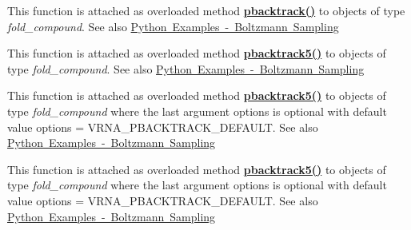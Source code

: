 \begin{DoxyRefList}
\item[Global \mbox{\hyperlink{group__subopt__stochbt_ga594844ac73c4e66e00d6791b31540634}{vrna\+\_\+pbacktrack}} (vrna\+\_\+fold\+\_\+compound\+\_\+t $\ast$fc)]\label{wrappers__wrappers000006}%
%
 This function is attached as overloaded method {\bfseries{\mbox{\hyperlink{group__subopt__stochbt__deprecated_gac03ca6db186bb3bf0a2a326d7fb3ba03}{pbacktrack()}}}} to objects of type {\itshape fold\+\_\+compound}. See also \mbox{\hyperlink{examples_python_examples_python_pbacktrack}{Python Examples -\/ Boltzmann Sampling}}  
\item[Global \mbox{\hyperlink{group__subopt__stochbt_ga72ebbe45bcbce147a12f27f62b38db78}{vrna\+\_\+pbacktrack5}} (vrna\+\_\+fold\+\_\+compound\+\_\+t $\ast$fc, unsigned int length)]\label{wrappers__wrappers000005}%
%
 This function is attached as overloaded method {\bfseries{\mbox{\hyperlink{group__subopt__stochbt__deprecated_gaf2e614b8beb4ddf3e8751433b76f39db}{pbacktrack5()}}}} to objects of type {\itshape fold\+\_\+compound}. See also \mbox{\hyperlink{examples_python_examples_python_pbacktrack}{Python Examples -\/ Boltzmann Sampling}}  
\item[Global \mbox{\hyperlink{group__subopt__stochbt_ga626beb5b5b962d7e7c8433cd2cfd4e93}{vrna\+\_\+pbacktrack5\+\_\+cb}} (vrna\+\_\+fold\+\_\+compound\+\_\+t $\ast$fc, unsigned int num\+\_\+samples, unsigned int length, vrna\+\_\+boltzmann\+\_\+sampling\+\_\+callback $\ast$cb, void $\ast$data, unsigned int options)]\label{wrappers__wrappers000009}%
%
 This function is attached as overloaded method {\bfseries{\mbox{\hyperlink{group__subopt__stochbt__deprecated_gaf2e614b8beb4ddf3e8751433b76f39db}{pbacktrack5()}}}} to objects of type {\itshape fold\+\_\+compound} where the last argument {\ttfamily options} is optional with default value {\ttfamily options = V\+R\+N\+A\+\_\+\+P\+B\+A\+C\+K\+T\+R\+A\+C\+K\+\_\+\+D\+E\+F\+A\+U\+LT}. See also \mbox{\hyperlink{examples_python_examples_python_pbacktrack}{Python Examples -\/ Boltzmann Sampling}}  
\item[Global \mbox{\hyperlink{group__subopt__stochbt_ga30c3ddff868c44eecfdb07d99a2422ba}{vrna\+\_\+pbacktrack5\+\_\+num}} (vrna\+\_\+fold\+\_\+compound\+\_\+t $\ast$fc, unsigned int num\+\_\+samples, unsigned int length, unsigned int options)]\label{wrappers__wrappers000007}%
%
 This function is attached as overloaded method {\bfseries{\mbox{\hyperlink{group__subopt__stochbt__deprecated_gaf2e614b8beb4ddf3e8751433b76f39db}{pbacktrack5()}}}} to objects of type {\itshape fold\+\_\+compound} where the last argument {\ttfamily options} is optional with default value {\ttfamily options = V\+R\+N\+A\+\_\+\+P\+B\+A\+C\+K\+T\+R\+A\+C\+K\+\_\+\+D\+E\+F\+A\+U\+LT}. See also \mbox{\hyperlink{examples_python_examples_python_pbacktrack}{Python Examples -\/ Boltzmann Sampling}}  

\end{DoxyRefList}

